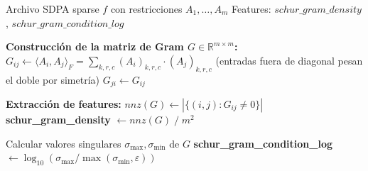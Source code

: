 \begin{algorithm}[H]
\caption{Extracción de features de la matriz de Gram asociada al sistema de Schur}
\label{alg:features_schur_gram}
\begin{algorithmic}[1]
\Require Archivo SDPA sparse $f$ con restricciones $A_1, \dots, A_m$
\Ensure  Features: $schur\_gram\_density$, $schur\_gram\_condition\_log$

\Statex \textbf{Construcción de la matriz de Gram $G \in \mathbb{R}^{m \times m}$:}
    \State $G_{ij} \gets \langle A_i, A_j \rangle_F
           = \sum_{k,r,c} (A_i)_{k,r,c} \cdot (A_j)_{k,r,c}$
    \Statex \hspace{2.5em} (entradas fuera de diagonal pesan el doble por simetría)
    \State $G_{ji} \gets G_{ij}$
\EndFor

\Statex \textbf{Extracción de features:}
\State $\textit{nnz}(G) \gets |\{(i,j) : G_{ij} \neq 0\}|$
\State \textbf{schur\_gram\_density}
       $\gets \textit{nnz}(G) \;/\; m^2$

\State Calcular valores singulares $\sigma_{\max}, \sigma_{\min}$ de $G$
\State \textbf{schur\_gram\_condition\_log}
       $\gets \log_{10}\!\left(\sigma_{\max} / \max(\sigma_{\min}, \varepsilon)\right)$
\end{algorithmic}
\end{algorithm}
